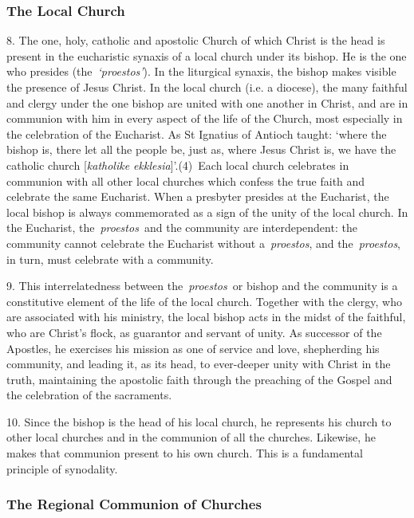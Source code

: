 \subsubsection{The Local Church}\label{the-local-church}

8. The one, holy, catholic and apostolic Church of which Christ is the
head is present in the eucharistic synaxis of a local church under its
bishop. He is the one who presides (the~\emph{`proestos'}). In the
liturgical synaxis, the bishop makes visible the presence of Jesus
Christ. In the local church (i.e. a diocese), the many faithful and
clergy under the one bishop are united with one another in Christ, and
are in communion with him in every aspect of the life of the Church,
most especially in the celebration of the Eucharist. As St Ignatius of
Antioch taught: `where the bishop is, there let all the people be, just
as, where Jesus Christ is, we have the catholic church
{[}\emph{katholike ekklesia}{]}'.(4)~Each local church celebrates in
communion with all other local churches which confess the true faith and
celebrate the same Eucharist. When a presbyter presides at the
Eucharist, the local bishop is always commemorated as a sign of the
unity of the local church. In the Eucharist, the~\emph{proestos~}and the
community are interdependent: the community cannot celebrate the
Eucharist without a~\emph{proestos}, and the~\emph{proestos}, in turn,
must celebrate with a community.

9. This interrelatedness between the~\emph{proestos~}or bishop and the
community is a constitutive element of the life of the local church.
Together with the clergy, who are associated with his ministry, the
local bishop acts in the midst of the faithful, who are Christ's flock,
as guarantor and servant of unity. As successor of the Apostles, he
exercises his mission as one of service and love, shepherding his
community, and leading it, as its head, to ever-deeper unity with Christ
in the truth, maintaining the apostolic faith through the preaching of
the Gospel and the celebration of the sacraments.

10. Since the bishop is the head of his local church, he represents his
church to other local churches and in the communion of all the churches.
Likewise, he makes that communion present to his own church. This is a
fundamental principle of synodality.

\subsubsection{The Regional Communion of
Churches}\label{the-regional-communion-of-churches}

